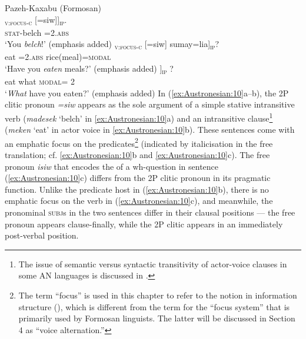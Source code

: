 \documentclass[output=paper,chinesefont]{../langscibook}
\begin{document}
\ea\label{ex:Austronesian:10} Pazeh-Kaxabu (Formosan)   \citep[106, 140]{Li2001}\\
\ea\gll
[[Ma-desek]\textsubscript{\textsc{v:focus-c}} [=siw]\textsubscript{\SUBJ}]\textsubscript{\textsc{ip}}. \\
 \phantom{[[}\textsc{stat}-belch \phantom{[}=2\SG.\textsc{abs}\\
\glt`You \emph{belch}!' (emphasis added)
\ex\gll
[[M\textlangle{in}{\textrangle}e-ken]\textsubscript{\textsc{v:focus-c}} [=siw]\textsubscript{\SUBJ} sumay=lia]\textsubscript{\textsc{ip}}? \\
\phantom{[[}\AV\textlangle{\PFV}{\textrangle}eat \phantom{[}=2\SG.\textsc{abs} rice(meal)=\textsc{modal}\\
\glt`Have you \emph{eaten} meals?' (emphasis added)
\ex\gll
[M\textlangle{in}{\textrangle}e-ken asai paj= [isiw]\textsubscript{\SUBJ}]\textsubscript{\textsc{ip}} ?\\
\phantom{[}\AV\textlangle{\PFV}{\textrangle}eat what \textsc{modal}= 2\SG\\
\glt`\emph{What} have you eaten?' (emphasis added)
\z\z
In (\ref{ex:Austronesian:10}a--b), the 2P clitic pronoun \emph{=siw} appears as the sole argument of a simple stative intransitive verb (\emph{madesek} `belch' in \ref{ex:Austronesian:10}a) and an intransitive clause\footnote{The issue of semantic versus syntactic transitivity of actor-voice clauses in some AN languages is discussed in .} (\emph{meken} `eat' in actor voice in \ref{ex:Austronesian:10}b). These sentences come with an emphatic focus on the predicates\footnote{The term ``focus'' is used in this chapter to refer to the notion in information structure (), which is different from the term for the ``focus system'' that is primarily used by Formosan linguists. The latter will be discussed in Section 4 as ``voice alternation.''} (indicated by italicisation in the free translation; cf. \ref{ex:Austronesian:10}b and \ref{ex:Austronesian:10}c). The free pronoun \emph{isiw} that encodes the \SUBJ of a wh-question in sentence (\ref{ex:Austronesian:10}c) differs from the 2P clitic pronoun in its pragmatic function. Unlike the predicate host in (\ref{ex:Austronesian:10}b), there is no emphatic focus on the verb in (\ref{ex:Austronesian:10}c), and meanwhile, the pronominal \textsc{subj}s in the two sentences differ in their clausal positions — the free pronoun appears clause-finally, while the 2P clitic appears in an immediately post-verbal position.
\end{document}

